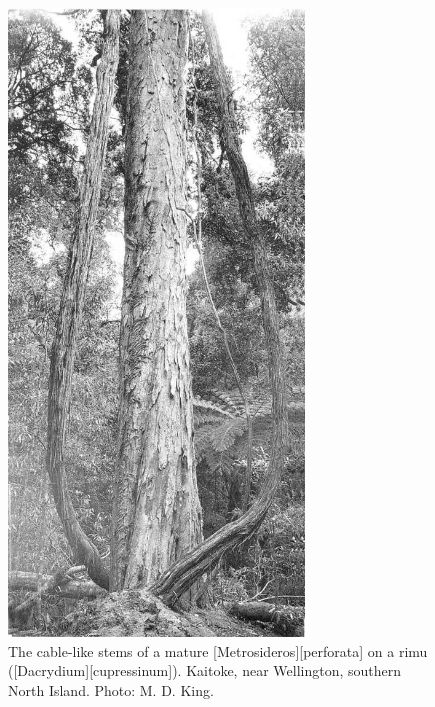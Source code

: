 \begin{figure}[htb]
\begin{minipage}[t]{0.526\textwidth}
    	\centering
    	\includegraphics[width=0.7\textwidth]{graphics/figure31perforata.jpg}
    	\caption[A mature \emph{Metrosideros perforata} on a rimu]{The cable-like stems of a mature [Metrosideros][perforata] on a rimu ([Dacrydium][cupressinum]). Kaitoke, near Wellington, southern North Island. Photo: M. D. King.}%
    	\label{fig:31perforata}
	\end{minipage}
\end{figure}

